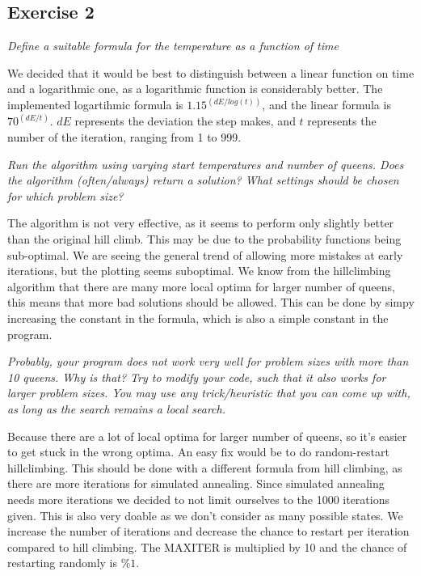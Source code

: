\documentclass{article}
\begin{document}
\subsection*{Exercise 2}


\textit{Define a suitable formula for the temperature as a function of time}

We decided that it would be best to distinguish between a linear function on time and a logarithmic one, as a logarithmic function is considerably better. The implemented logartihmic formula is $1.15^(dE / log(t))$, and the linear formula is $70^(dE/t)$. $dE$ represents the deviation the step makes, and $t$ represents the number of the iteration, ranging from 1 to 999.


\textit{ Run the algorithm using varying start temperatures and number of queens. Does the algorithm (often/always) return a solution? What settings should be chosen for which problem size?}

The algorithm is not very effective, as it seems to perform only slightly better than the original hill climb. This may be due to the probability functions being sub-optimal. We are seeing the general trend of allowing more mistakes at early iterations, but the plotting seems suboptimal. We know from the hillclimbing algorithm that there are many more local optima for larger number of queens, this means that more bad solutions should be allowed. This can be done by simpy increasing the constant in the formula, which is also a simple constant in the program.

\textit{Probably, your program does not work very well for problem sizes with more than 10 queens. Why is that? Try to modify your code, such that it also works for larger problem sizes. You may use any trick/heuristic that you can come up with, as long as the search remains a local search.}

Because there are a lot of local optima for larger number of queens, so it's easier to get stuck in the wrong optima. An easy fix would be to do random-restart hillclimbing. This should be done with a different formula from hill climbing, as there are more iterations for simulated annealing. Since simulated annealing needs more iterations we decided to not limit ourselves to the 1000 iterations given. This is also very doable as we don't consider as many possible states. We increase the number of iterations and decrease the chance to restart per iteration compared to hill climbing. The MAXITER is multiplied by 10 and the chance of restarting randomly is $\%1$.
\end{document}
